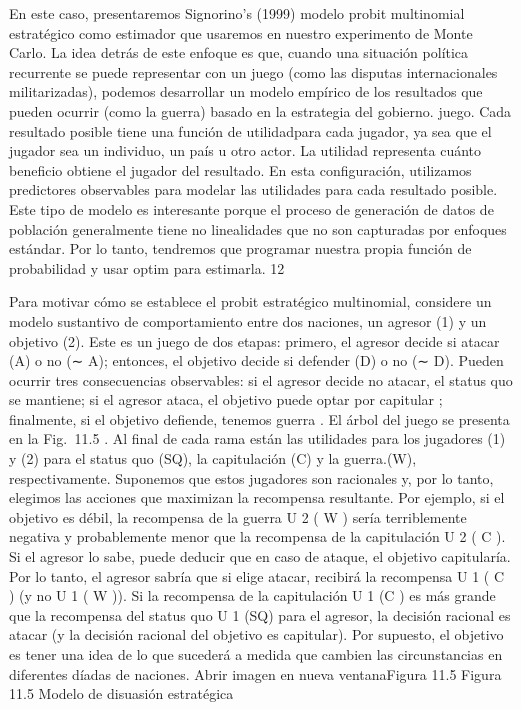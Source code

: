 \documentclass[
]{book}
\begin{document}
En este caso, presentaremos Signorino's (1999) modelo probit multinomial estratégico como estimador que usaremos en nuestro experimento de Monte Carlo. La idea detrás de este enfoque es que, cuando una situación política recurrente se puede representar con un juego (como las disputas internacionales militarizadas), podemos desarrollar un modelo empírico de los resultados que pueden ocurrir (como la guerra) basado en la estrategia del gobierno. juego. Cada resultado posible tiene una función de utilidadpara cada jugador, ya sea que el jugador sea un individuo, un país u otro actor. La utilidad representa cuánto beneficio obtiene el jugador del resultado. En esta configuración, utilizamos predictores observables para modelar las utilidades para cada resultado posible. Este tipo de modelo es interesante porque el proceso de generación de datos de población generalmente tiene no linealidades que no son capturadas por enfoques estándar. Por lo tanto, tendremos que programar nuestra propia función de probabilidad y usar optim para estimarla. 12

Para motivar cómo se establece el probit estratégico multinomial, considere un modelo sustantivo de comportamiento entre dos naciones, un agresor (1) y un objetivo (2). Este es un juego de dos etapas: primero, el agresor decide si atacar (A) o no (∼ A); entonces, el objetivo decide si defender (D) o no (∼ D). Pueden ocurrir tres consecuencias observables: si el agresor decide no atacar, el status quo se mantiene; si el agresor ataca, el objetivo puede optar por capitular ; finalmente, si el objetivo defiende, tenemos guerra . El árbol del juego se presenta en la Fig.  11.5 . Al final de cada rama están las utilidades para los jugadores (1) y (2) para el status quo (SQ), la capitulación (C) y la guerra.(W), respectivamente. Suponemos que estos jugadores son racionales y, por lo tanto, elegimos las acciones que maximizan la recompensa resultante. Por ejemplo, si el objetivo es débil, la recompensa de la guerra U 2 ( W ) sería terriblemente negativa y probablemente menor que la recompensa de la capitulación U 2 ( C ). Si el agresor lo sabe, puede deducir que en caso de ataque, el objetivo capitularía. Por lo tanto, el agresor sabría que si elige atacar, recibirá la recompensa U 1 ( C ) (y no U 1 ( W )). Si la recompensa de la capitulación U 1 (C ) es más grande que la recompensa del status quo U 1 (SQ) para el agresor, la decisión racional es atacar (y la decisión racional del objetivo es capitular). Por supuesto, el objetivo es tener una idea de lo que sucederá a medida que cambien las circunstancias en diferentes díadas de naciones.
Abrir imagen en nueva ventanaFigura 11.5
Figura 11.5
Modelo de disuasión estratégica
\end{document}
